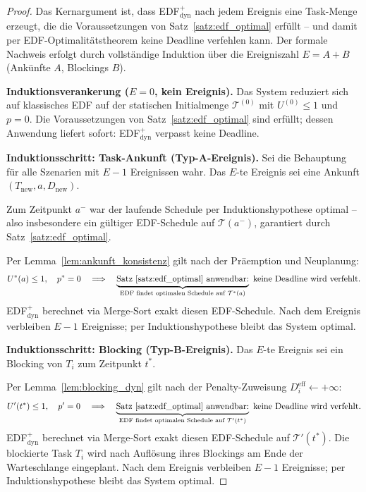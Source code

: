 ﻿\documentclass[a4paper,12pt]{article}
\theoremstyle{definition}
\begin{document}
	\begin{proof}
		Das Kernargument ist, dass EDF$^+_{\mathrm{dyn}}$ nach jedem Ereignis
		eine Task-Menge erzeugt, die die Voraussetzungen von
		Satz~\ref{satz:edf_optimal} erfüllt -- und damit per
		EDF-Optimalitätstheorem keine Deadline verfehlen kann.
		Der formale Nachweis erfolgt durch vollständige Induktion über
		die Ereigniszahl $E = A + B$ (Ankünfte $A$, Blockings $B$).

		\medskip
		\textbf{Induktionsverankerung ($E = 0$, kein Ereignis).}
		Das System reduziert sich auf klassisches EDF auf der statischen
		Initialmenge $\mathcal{T}^{(0)}$ mit $U^{(0)} \le 1$ und $p = 0$.
		Die Voraussetzungen von Satz~\ref{satz:edf_optimal} sind erfüllt;
		dessen Anwendung liefert sofort: EDF$^+_{\mathrm{dyn}}$ verpasst
		keine Deadline.

		\medskip
		\textbf{Induktionsschritt: Task-Ankunft (Typ-A-Ereignis).}
		Sei die Behauptung für alle Szenarien mit $E - 1$ Ereignissen wahr.
		Das $E$-te Ereignis sei eine Ankunft $(T_{\text{new}}, a, D_{\text{new}})$.

		Zum Zeitpunkt $a^-$ war der laufende Schedule per Induktionshypothese
		optimal -- also insbesondere ein gültiger EDF-Schedule auf
		$\mathcal{T}(a^-)$, garantiert durch Satz~\ref{satz:edf_optimal}.

		Per Lemma~\ref{lem:ankunft_konsistenz} gilt nach der Präemption und
		Neuplanung:
		\[
		U^*(a) \le 1,\quad p^* = 0
		\quad\Longrightarrow\quad
		\underbrace{\text{Satz~\ref{satz:edf_optimal} anwendbar:}}_{\text{EDF findet optimalen Schedule auf }\mathcal{T}^*(a)}
		\text{ keine Deadline wird verfehlt.}
		\]
		EDF$^+_{\mathrm{dyn}}$ berechnet via Merge-Sort exakt diesen EDF-Schedule.
		Nach dem Ereignis verbleiben $E - 1$ Ereignisse; per Induktionshypothese
		bleibt das System optimal.

		\medskip
		\textbf{Induktionsschritt: Blocking (Typ-B-Ereignis).}
		Das $E$-te Ereignis sei ein Blocking von $T_i$ zum Zeitpunkt $t^*$.

		Per Lemma~\ref{lem:blocking_dyn} gilt nach der Penalty-Zuweisung
		$D_i^{\text{eff}} \leftarrow +\infty$:
		\[
		U'(t^*) \le 1,\quad p' = 0
		\quad\Longrightarrow\quad
		\underbrace{\text{Satz~\ref{satz:edf_optimal} anwendbar:}}_{\text{EDF findet optimalen Schedule auf }\mathcal{T}'(t^*)}
		\text{ keine Deadline wird verfehlt.}
		\]
		EDF$^+_{\mathrm{dyn}}$ berechnet via Merge-Sort exakt diesen EDF-Schedule
		auf $\mathcal{T}'(t^*)$. Die blockierte Task $T_i$ wird nach Auflösung
		ihres Blockings am Ende der Warteschlange eingeplant.
		Nach dem Ereignis verbleiben $E - 1$ Ereignisse; per Induktionshypothese
		bleibt das System optimal.


\end{proof}
\end{document}
